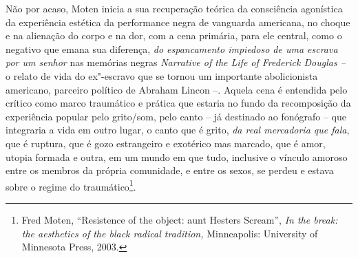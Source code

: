 Não por acaso, Moten inicia a sua recuperação teórica da consciência
agonística da experiência estética da performance negra de vanguarda
americana, no choque e na alienação do corpo e na dor, com a cena
primária, para ele central, como o negativo que emana sua diferença,
\emph{do espancamento impiedoso de uma escrava por um senhor} nas
memórias negras \emph{Narrative of the Life of Frederick Douglas --} o
relato de vida do ex"-escravo que se tornou um importante abolicionista
americano, parceiro político de Abraham Lincon --. Aquela cena é
entendida pelo crítico como marco traumático e prática que estaria no
fundo da recomposição da experiência popular pelo grito/som, pelo canto
-- já destinado ao fonógrafo -- que integraria a vida em outro lugar, o
canto que é grito, \emph{da real mercadoria que fala}, que é ruptura,
que é gozo estrangeiro e exotérico mas marcado, que é amor, utopia
formada e outra, em um mundo em que tudo, inclusive o vínculo amoroso
entre os membros da própria comunidade, e entre os sexos, se perdeu e
estava sobre o regime do traumático\footnote{Fred Moten, ``Resistence of
  the object: aunt Hesters Scream'', \emph{In the break: the aesthetics
  of the black radical tradition,} Minneapolis: University of Minnesota
  Press, 2003.}.

